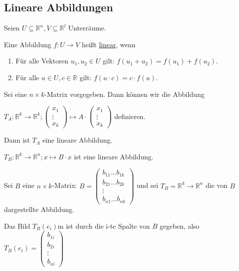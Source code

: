 \documentclass{mg2}
\begin{document}
\subsection{Lineare Abbildungen}
\begin{definition}
Seien $U \subseteq \mathbb{R}^n, V \subseteq \mathbb{R}^l$ Unterräume.

Eine Abbildung $f: U \to V$ heißt \underline{linear}, wenn
\begin{enumerate}
\item Für alle Vektoren $u_1,u_2 \in U$ gilt: $f(u_1+u_2) = f(u_1) + f(u_2)$.
\item Für alle $u \in U, c \in \mathbb{R}$ gilt: $f(u\cdot c) = c \cdot f(u)$.
\end{enumerate}
\end{definition}

\begin{satz}
Sei eine $n \times k$-Matrix vorgegeben. Dann können wir die Abbildung 

$T_A: \mathbb{R}^k \to \mathbb{R}^k; \begin{pmatrix}x_1\\\vdots\\x_k\end{pmatrix} \mapsto A \cdot \begin{pmatrix}x_1\\\vdots\\x_k\end{pmatrix}$ definieren.

Dann ist $T_A$ eine lineare Abbildung.
\end{satz}

\begin{satz}
$T_B: \mathbb{R}^k \to \mathbb{R}^n; x \mapsto B \cdot x$ ist eine lineare Abbildung.
\end{satz}

\begin{proposition}
Sei $B$ eine $n \times k$-Matrix: $B = \begin{pmatrix} b_{11} \dots b_{1k}\\ b_{21} \dots b_{2k}\\\vdots\\ b_{n1} \dots b_{nk}\end{pmatrix}$ und sei $T_B = \mathbb{R}^k \to \mathbb{R}^n$ die von $B$ dargestellte Abbildung. 

Das Bild $T_B(e_i)$m ist durch die i-te Spalte von $B$ gegeben, also $T_B(e_i) = \begin{pmatrix}b_{1i}\\b_{2i}\\\vdots\\b_{ni}\end{pmatrix}$
\end{proposition}
\end{document}
